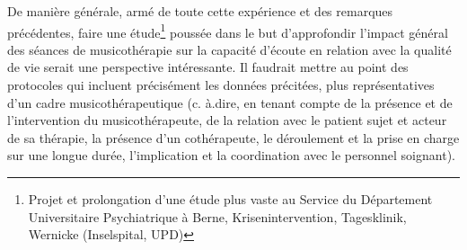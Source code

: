 De manière générale, armé de toute cette expérience et des remarques précédentes, faire une 
étude\footnote{ Projet et
	prolongation d'une étude plus vaste au Service du
	Département Universitaire Psychiatrique à Berne, Krisenintervention,
	Tagesklinik, Wernicke (Inselspital, UPD) } poussée dans le but d'approfondir l'impact général
des séances de musicothérapie sur la capacité d'écoute en relation avec la qualité de vie serait une 
perspective intéressante. Il faudrait mettre au point 
des protocoles qui incluent précisément les données précitées, plus représentatives d'un cadre 
musicothérapeutique (c. à.dire, en tenant compte de la 
présence et de l'intervention du musicothérapeute, de la relation avec le patient sujet et acteur de sa 
thérapie, la présence d'un cothérapeute, le déroulement et la prise en charge sur une longue durée, 
l'implication et la coordination avec le personnel soignant).






















 

